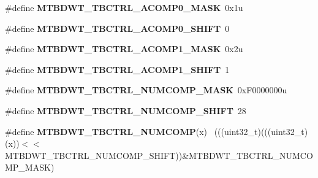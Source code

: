 \begin{DoxyCompactItemize}
\item 
\hypertarget{group___m_t_b_d_w_t___register___masks_ga6700f71254985be76d08c98be405c876}{}\#define {\bfseries M\+T\+B\+D\+W\+T\+\_\+\+T\+B\+C\+T\+R\+L\+\_\+\+A\+C\+O\+M\+P0\+\_\+\+M\+A\+S\+K}~0x1u\label{group___m_t_b_d_w_t___register___masks_ga6700f71254985be76d08c98be405c876}

\item 
\hypertarget{group___m_t_b_d_w_t___register___masks_ga3f297c6f29c0139f278543f70bb136a5}{}\#define {\bfseries M\+T\+B\+D\+W\+T\+\_\+\+T\+B\+C\+T\+R\+L\+\_\+\+A\+C\+O\+M\+P0\+\_\+\+S\+H\+I\+F\+T}~0\label{group___m_t_b_d_w_t___register___masks_ga3f297c6f29c0139f278543f70bb136a5}

\item 
\hypertarget{group___m_t_b_d_w_t___register___masks_ga705f0b194cf2368d788195be4572665f}{}\#define {\bfseries M\+T\+B\+D\+W\+T\+\_\+\+T\+B\+C\+T\+R\+L\+\_\+\+A\+C\+O\+M\+P1\+\_\+\+M\+A\+S\+K}~0x2u\label{group___m_t_b_d_w_t___register___masks_ga705f0b194cf2368d788195be4572665f}

\item 
\hypertarget{group___m_t_b_d_w_t___register___masks_gafadbf74633562a3f35979a381188ed38}{}\#define {\bfseries M\+T\+B\+D\+W\+T\+\_\+\+T\+B\+C\+T\+R\+L\+\_\+\+A\+C\+O\+M\+P1\+\_\+\+S\+H\+I\+F\+T}~1\label{group___m_t_b_d_w_t___register___masks_gafadbf74633562a3f35979a381188ed38}

\item 
\hypertarget{group___m_t_b_d_w_t___register___masks_ga15e57c95e23eee0df8332b48e65b9ef7}{}\#define {\bfseries M\+T\+B\+D\+W\+T\+\_\+\+T\+B\+C\+T\+R\+L\+\_\+\+N\+U\+M\+C\+O\+M\+P\+\_\+\+M\+A\+S\+K}~0x\+F0000000u\label{group___m_t_b_d_w_t___register___masks_ga15e57c95e23eee0df8332b48e65b9ef7}

\item 
\hypertarget{group___m_t_b_d_w_t___register___masks_ga6f08c35f3754371bd7ee8209b27c746e}{}\#define {\bfseries M\+T\+B\+D\+W\+T\+\_\+\+T\+B\+C\+T\+R\+L\+\_\+\+N\+U\+M\+C\+O\+M\+P\+\_\+\+S\+H\+I\+F\+T}~28\label{group___m_t_b_d_w_t___register___masks_ga6f08c35f3754371bd7ee8209b27c746e}

\item 
\hypertarget{group___m_t_b_d_w_t___register___masks_ga344e03dee410b412c4e2fef476aaeaab}{}\#define {\bfseries M\+T\+B\+D\+W\+T\+\_\+\+T\+B\+C\+T\+R\+L\+\_\+\+N\+U\+M\+C\+O\+M\+P}(x)                              ~(((uint32\+\_\+t)(((uint32\+\_\+t)(x))$<$$<$M\+T\+B\+D\+W\+T\+\_\+\+T\+B\+C\+T\+R\+L\+\_\+\+N\+U\+M\+C\+O\+M\+P\+\_\+\+S\+H\+I\+F\+T))\&M\+T\+B\+D\+W\+T\+\_\+\+T\+B\+C\+T\+R\+L\+\_\+\+N\+U\+M\+C\+O\+M\+P\+\_\+\+M\+A\+S\+K)\label{group___m_t_b_d_w_t___register___masks_ga344e03dee410b412c4e2fef476aaeaab}


\end{DoxyCompactItemize}
